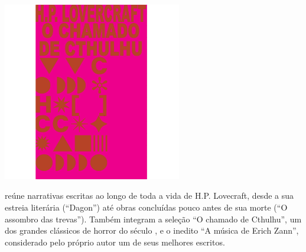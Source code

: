 \vfill

\hspace*{-.4cm}\begin{minipage}[c]{.5\linewidth}
\small{
{}}
\end{minipage}



\pagebreak


\begin{center}
\hspace*{.5cm}\includegraphics[width=78mm]{./grid/lovecraft.jpg}
\end{center}

\hspace*{-7cm}\hrulefill\hspace*{-7cm}

\medskip

 reúne narrativas escritas ao longo de toda a vida de H.P. Lovecraft, desde a sua estreia literária (“Dagon”) até obras concluídas pouco antes de sua morte (“O assombro das trevas”). Também integram a seleção
“O chamado de Cthulhu”, um dos grandes clássicos de horror do século , e o inedito “A música de Erich Zann”, considerado pelo próprio autor um de seus melhores escritos.

